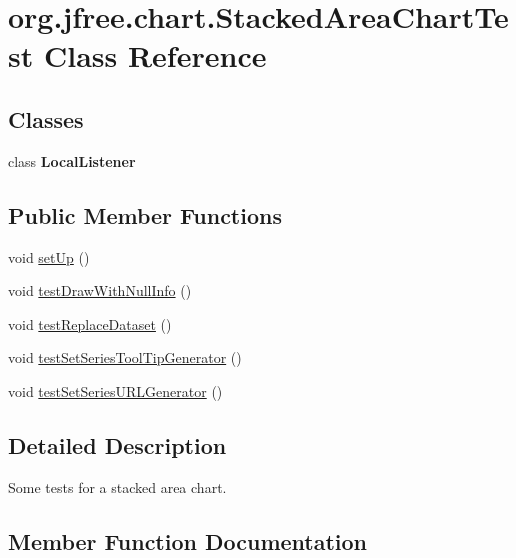 \hypertarget{classorg_1_1jfree_1_1chart_1_1_stacked_area_chart_test}{}\section{org.\+jfree.\+chart.\+Stacked\+Area\+Chart\+Test Class Reference}
\label{classorg_1_1jfree_1_1chart_1_1_stacked_area_chart_test}
\subsection*{Classes}
\begin{DoxyCompactItemize}
\item 
class {\bfseries Local\+Listener}
\end{DoxyCompactItemize}
\subsection*{Public Member Functions}
\begin{DoxyCompactItemize}
\item 
void \mbox{\hyperlink{classorg_1_1jfree_1_1chart_1_1_stacked_area_chart_test_af8d3b760d5da1657c01edd941984264b}{set\+Up}} ()
\item 
void \mbox{\hyperlink{classorg_1_1jfree_1_1chart_1_1_stacked_area_chart_test_a3e52666ca921e565552cf39d695087c4}{test\+Draw\+With\+Null\+Info}} ()
\item 
void \mbox{\hyperlink{classorg_1_1jfree_1_1chart_1_1_stacked_area_chart_test_ae67bbb394a086eaac0b72dda106f71af}{test\+Replace\+Dataset}} ()
\item 
void \mbox{\hyperlink{classorg_1_1jfree_1_1chart_1_1_stacked_area_chart_test_aa24c4a3f61f9ebb9af056651811b5164}{test\+Set\+Series\+Tool\+Tip\+Generator}} ()
\item 
void \mbox{\hyperlink{classorg_1_1jfree_1_1chart_1_1_stacked_area_chart_test_a2fbced4a83a7235c60f71eda447207d9}{test\+Set\+Series\+U\+R\+L\+Generator}} ()
\end{DoxyCompactItemize}


\subsection{Detailed Description}
Some tests for a stacked area chart. 

\subsection{Member Function Documentation}
\mbox{\label{classorg_1_1jfree_1_1chart_1_1_stacked_area_chart_test_af8d3b760d5da1657c01edd941984264b}} 
